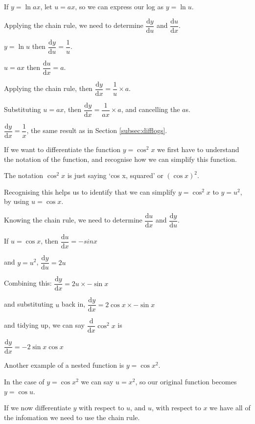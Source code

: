 \documentclass[
]{book}
\begin{document}
If \(y = \ln {ax}\), let \(u=ax\), so we can express our log as \(y = \ln u\).

Applying the chain rule, we need to determine \(\dfrac{\textrm{d}y}{\textrm{d}u}\) and \(\dfrac{\textrm{d}u}{\textrm{d}x}\).

\(y = \ln u\) then \(\dfrac{\textrm{d}y}{\textrm{d}u} = \dfrac{1}{u}\).

\(u=ax\) then \(\dfrac{\textrm{d}u}{\textrm{d}x}=a\).

Applying the chain rule, then \(\dfrac{\textrm{d}y}{\textrm{d}x}=\dfrac{1}{u} \times a\).

Substituting \(u = ax\), then \(\dfrac{\textrm{d}y}{\textrm{d}x}=\dfrac{1}{ax} \times a\), and cancelling the \(a\)s.

\(\dfrac{\textrm{d}y}{\textrm{d}x}=\dfrac{1}{x}\), the same result as in Section \ref{subsec:difflogs}.

If we want to differentiate the function \(y=\cos ^2 x\) we first have to understand the notation of the function, and recognise how we can simplify this function.

The notation \(\cos ^2 x\) is just saying `cos x, squared' or \((\cos x)^2\).

Recognising this helps us to identify that we can simplify \(y=\cos ^2 x\) to \(y=u^2\), by using \(u=\cos x\).

Knowing the chain rule, we need to determine \(\dfrac{\textrm{d}u}{\textrm{d}x}\) and \(\dfrac{\textrm{d}y}{\textrm{d}u}\).

If \(u=\cos x\), then \(\dfrac{\textrm{d}u}{\textrm{d}x} = -sin x\)

and \(y=u^2\), \(\dfrac{\textrm{d}y}{\textrm{d}u}=2u\)

Combining this: \(\dfrac{\textrm{d}y}{\textrm{d}x} = 2u \times -\sin x\)

and substituting \(u\) back in, \(\dfrac{\textrm{d}y}{\textrm{d}x} = 2\cos x \times -\sin x\)

and tidying up, we can say \(\dfrac{\textrm{d}}{\textrm{d}x}\cos ^2 x\) is

\(\dfrac{\textrm{d}y}{\textrm{d}x} = -2\sin x\cos x\)

Another example of a nested function is \(y=\cos x^2\).

In the case of \(y=\cos x^2\) we can say \(u=x^2\), so our original function becomes \(y=\cos u\).

If we now differentiate \(y\) with respect to \(u\), and \(u\), with respect to \(x\) we have all of the infomation we need to use the chain rule.
\end{document}
